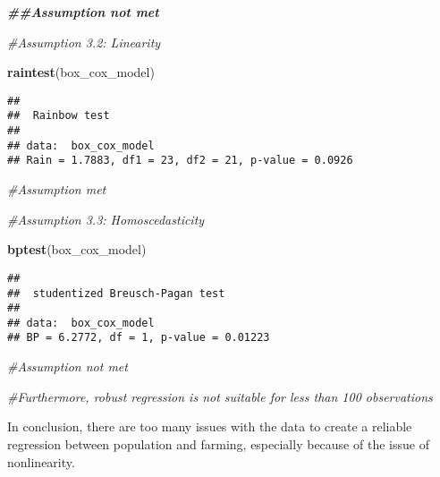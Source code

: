 \documentclass[
]{article}
\newenvironment{Shaded}{\begin{snugshade}}{\end{snugshade}}
\newcommand{\AttributeTok}[1]{\textcolor[rgb]{0.13,0.29,0.53}{#1}}
\newcommand{\CommentTok}[1]{\textcolor[rgb]{0.56,0.35,0.01}{\textit{#1}}}
\newcommand{\DocumentationTok}[1]{\textcolor[rgb]{0.56,0.35,0.01}{\textbf{\textit{#1}}}}
\newcommand{\FunctionTok}[1]{\textcolor[rgb]{0.13,0.29,0.53}{\textbf{#1}}}
\newcommand{\NormalTok}[1]{#1}
\newcommand{\SpecialCharTok}[1]{\textcolor[rgb]{0.81,0.36,0.00}{\textbf{#1}}}
\newcommand{\StringTok}[1]{\textcolor[rgb]{0.31,0.60,0.02}{#1}}
\begin{document}
\begin{Shaded}
\begin{Highlighting}[]
\DocumentationTok{\#\#Assumption not met}

\CommentTok{\#Assumption 3.2: Linearity}

\FunctionTok{raintest}\NormalTok{(box\_cox\_model)}
\end{Highlighting}
\end{Shaded}

\begin{verbatim}
## 
##  Rainbow test
## 
## data:  box_cox_model
## Rain = 1.7883, df1 = 23, df2 = 21, p-value = 0.0926
\end{verbatim}

\begin{Shaded}
\begin{Highlighting}[]
\CommentTok{\#Assumption met}

\CommentTok{\#Assumption 3.3: Homoscedasticity}

\FunctionTok{bptest}\NormalTok{(box\_cox\_model)}
\end{Highlighting}
\end{Shaded}

\begin{verbatim}
## 
##  studentized Breusch-Pagan test
## 
## data:  box_cox_model
## BP = 6.2772, df = 1, p-value = 0.01223
\end{verbatim}

\begin{Shaded}
\begin{Highlighting}[]
\CommentTok{\#Assumption not met}

\CommentTok{\#Furthermore, robust regression is not suitable for less than 100 observations}
\end{Highlighting}
\end{Shaded}

In conclusion, there are too many issues with the data to create a
reliable regression between population and farming, especially because
of the issue of nonlinearity.

\begin{Shaded}
\end{Shaded}
\end{document}
